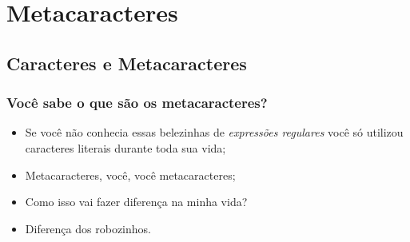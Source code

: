 \newcommand{\meta}[2]{
	\begin{frame}
		\frametitle{#1}
		\centering
		{\fontsize{5cm}{1em}\selectfont \textbf{#2}}
	\end{frame}
}


\section{Metacaracteres}
\frame{\tableofcontents[currentsection]}

\subsection{Caracteres e Metacaracteres}

\begin{frame}
	\frametitle{Você sabe o que são os metacaracteres?}
	
	\begin{itemize}
		\item Se você não conhecia essas belezinhas de \textit{expressões regulares} você só utilizou caracteres literais durante toda sua vida;

		\item Metacaracteres, você, você metacaracteres;

		\item Como isso vai fazer diferença na minha vida?

		\item Diferença dos robozinhos.		
	\end{itemize}
\end{frame}

